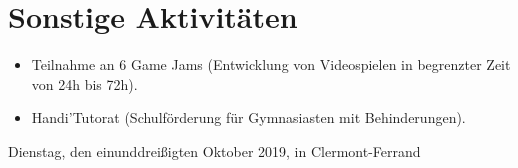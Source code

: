 \documentclass[11pt, a4paper, sans]{moderncv}
\begin{document}
\section{Sonstige Aktivitäten}
\begin{itemize}[label=\textbullet]
	\setlength\itemsep{0mm}
	\item Teilnahme an 6 Game Jams (Entwicklung von Videospielen in begrenzter Zeit von 24h bis 72h).
	\item Handi'Tutorat (Schulförderung für Gymnasiasten mit Behinderungen).
\end{itemize}

\bigskip
\raggedleft Dienstag, den einunddreißigten Oktober 2019, in Clermont-Ferrand
\end{document}
